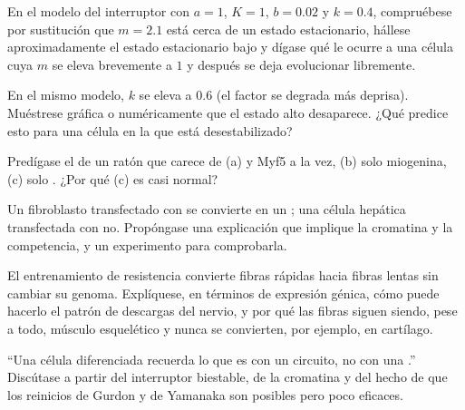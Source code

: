 \begin{exercise}[$\star\star$]\label{exo:b2:cell-differentiation:7}
En el modelo del interruptor con $a = 1$, $K = 1$, $b = 0.02$ y $k = 0.4$,
compruébese por sustitución que $m = 2.1$ está cerca de un estado
estacionario, hállese aproximadamente el estado estacionario bajo y
dígase qué le ocurre a una célula cuya $m$ se eleva brevemente a $1$ y
después se deja evolucionar libremente.
\end{exercise}

\begin{exercise}[$\star\star$]\label{exo:b2:cell-differentiation:8}
En el mismo modelo, $k$ se eleva a $0.6$ (el factor se degrada más
deprisa). Muéstrese gráfica o numéricamente que el estado alto
desaparece. ¿Qué predice esto para una célula en la que  está
desestabilizado?
\end{exercise}

\begin{exercise}[$\star\star$]\label{exo:b2:cell-differentiation:9}
Predígase el  de un ratón que carece de (a)  y Myf5 a la vez,
(b) solo miogenina, (c) solo . ¿Por qué (c) es casi normal?
\end{exercise}

\begin{exercise}[$\star\star\star$]\label{exo:b2:cell-differentiation:10}
Un fibroblasto transfectado con  se convierte en un ; una
célula hepática transfectada con  no. Propóngase una explicación que
implique la cromatina y la competencia, y un experimento para
comprobarla.
\end{exercise}

\begin{exercise}[$\star\star\star$]\label{exo:b2:cell-differentiation:11}
El entrenamiento de resistencia convierte fibras rápidas hacia fibras
lentas sin cambiar su genoma. Explíquese, en términos de expresión génica,
cómo puede hacerlo el patrón de descargas del nervio, y por qué las fibras
siguen siendo, pese a todo, músculo esquelético y nunca se convierten,
por ejemplo, en cartílago.
\end{exercise}

\begin{exercise}[$\star\star\star$]\label{exo:b2:cell-differentiation:12}
``Una célula diferenciada recuerda lo que es con un circuito, no con una
.'' Discútase a partir del interruptor biestable, de la cromatina
y del hecho de que los reinicios de Gurdon y de Yamanaka son posibles pero
poco eficaces.
\end{exercise}

